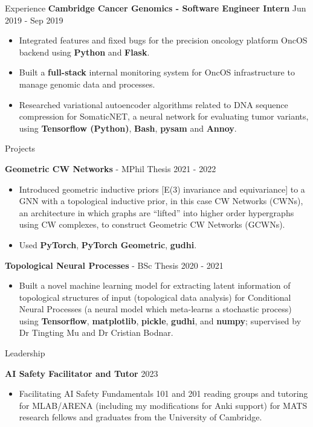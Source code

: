 \documentclass[hidelinks]{resume} %
\begin{document}
\begin{rSection}{Experience}
\textbf{Cambridge Cancer Genomics - Software Engineer Intern}
\hfill {Jun 2019 - Sep 2019}
\begin{itemize}
    \item Integrated features and fixed bugs for the precision oncology platform OncOS backend using \textbf{Python} and \textbf{Flask}.
    \item Built a \textbf{full-stack} internal monitoring system for OncOS infrastructure to manage genomic data and processes.
    \item Researched variational autoencoder algorithms related to DNA sequence compression for SomaticNET, a neural network for evaluating tumor variants, using \textbf{Tensorflow (Python)}, \textbf{Bash}, \textbf{pysam} and \textbf{Annoy}.
\end{itemize}

\end{rSection} 
\begin{rSection}{Projects}

\textbf{Geometric CW Networks} - MPhil Thesis
\hfill{2021 - 2022}
\begin{itemize}
    \item Introduced geometric inductive priors [E(3) invariance and equivariance] to a GNN with a topological inductive prior, in this case CW Networks (CWNs), an architecture in which graphs are ``lifted'' into higher order hypergraphs using CW complexes, to construct Geometric CW Networks (GCWNs).
    \item Used \textbf{PyTorch}, \textbf{PyTorch Geometric}, \textbf{gudhi}.
\end{itemize}

\textbf{Topological Neural Processes} - BSc Thesis
\hfill{2020 - 2021}
\begin{itemize}
    \item Built a novel machine learning model for extracting latent information of topological structures of input (topological data analysis) for Conditional Neural Processes (a neural model which meta-learns a stochastic process) using \textbf{Tensorflow}, \textbf{matplotlib}, \textbf{pickle}, \textbf{gudhi}, and \textbf{numpy}; supervised by Dr Tingting Mu and Dr Cristian Bodnar.
\end{itemize}

\end{rSection}
\begin{rSection}{Leadership}

\textbf{AI Safety Facilitator and Tutor}
\hfill{2023}
\begin{itemize}
    \item Facilitating AI Safety Fundamentals 101 and 201 reading groups and tutoring for MLAB/ARENA (including my modifications for Anki support) for MATS research fellows and graduates from the University of Cambridge.
\end{itemize}

\end{rSection}
\end{document}
